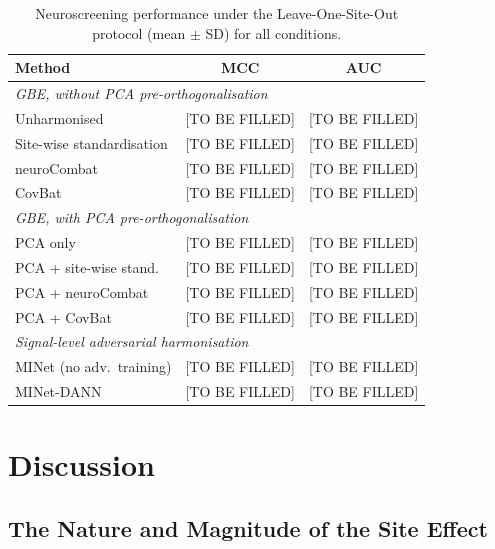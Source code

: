 \documentclass[preprint,12pt]{elsarticle}
\begin{document}
\begin{table}[htbp]
  \centering
  \caption{Neuroscreening performance under the Leave-One-Site-Out
    protocol (mean $\pm$ SD) for all conditions.}
  \label{tab:clinical_loso}
  \begin{tabular}{lcc}
    \toprule
    \textbf{Method} & \textbf{MCC} & \textbf{AUC} \\
    \midrule
    \multicolumn{3}{l}{\textit{GBE, without PCA pre-orthogonalisation}} \\
    \quad Unharmonised               & [TO BE FILLED] & [TO BE FILLED] \\
    \quad Site-wise standardisation  & [TO BE FILLED] & [TO BE FILLED] \\
    \quad neuroCombat                & [TO BE FILLED] & [TO BE FILLED] \\
    \quad CovBat                     & [TO BE FILLED] & [TO BE FILLED] \\
    \midrule
    \multicolumn{3}{l}{\textit{GBE, with PCA pre-orthogonalisation}} \\
    \quad PCA only                   & [TO BE FILLED] & [TO BE FILLED] \\
    \quad PCA + site-wise stand.     & [TO BE FILLED] & [TO BE FILLED] \\
    \quad PCA + neuroCombat          & [TO BE FILLED] & [TO BE FILLED] \\
    \quad PCA + CovBat               & [TO BE FILLED] & [TO BE FILLED] \\
    \midrule
    \multicolumn{3}{l}{\textit{Signal-level adversarial harmonisation}} \\
    \quad MINet (no adv.\ training)  & [TO BE FILLED] & [TO BE FILLED] \\
    \quad MINet-DANN                 & [TO BE FILLED] & [TO BE FILLED] \\
    \bottomrule
  \end{tabular}
\end{table}

\section{Discussion}
\label{sec:discussion}

\subsection{The Nature and Magnitude of the Site Effect}
\label{subsec:disc_site_effect}
\end{document}
